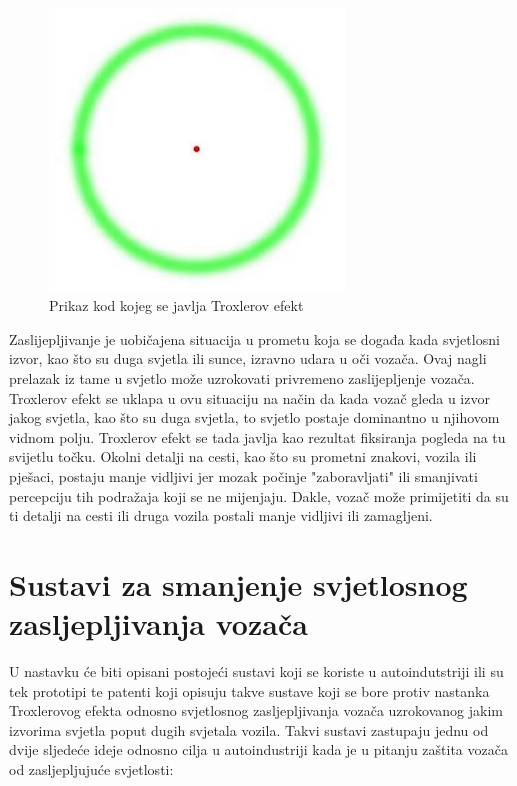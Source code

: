 \documentclass{foi}
\begin{document}
\begin{figure}[h!]
    \centering
    \includegraphics[width=0.7\textwidth]{slike/troxler_effect}
    \caption{Prikaz kod kojeg se javlja Troxlerov efekt \cite{Autoevolution2022}}
    \label{fig:troxlerov_efekt}
\end{figure}

\newpage

Zaslijepljivanje je uobičajena situacija u prometu koja se događa kada svjetlosni izvor, kao što su duga svjetla ili sunce, izravno udara u oči vozača. Ovaj nagli prelazak iz tame u svjetlo može uzrokovati privremeno zaslijepljenje vozača. Troxlerov efekt se uklapa u ovu situaciju na način da kada vozač gleda u izvor jakog svjetla, kao što su duga svjetla, to svjetlo postaje dominantno u njihovom vidnom polju. Troxlerov efekt se tada javlja kao rezultat fiksiranja pogleda na tu svijetlu točku. Okolni detalji na cesti, kao što su prometni znakovi, vozila ili pješaci, postaju manje vidljivi jer mozak počinje "zaboravljati" ili smanjivati percepciju tih podražaja koji se ne mijenjaju. Dakle, vozač može primijetiti da su ti detalji na cesti ili druga vozila postali manje vidljivi ili zamagljeni. \cite{Autoevolution2022}

\section{Sustavi za smanjenje svjetlosnog zasljepljivanja vozača}

U nastavku će biti opisani postojeći sustavi koji se koriste u autoindutstriji ili su tek prototipi te patenti koji opisuju takve sustave koji se bore protiv nastanka Troxlerovog efekta odnosno svjetlosnog zasljepljivanja vozača uzrokovanog jakim izvorima svjetla poput dugih svjetala vozila. Takvi sustavi zastupaju jednu od dvije sljedeće ideje odnosno cilja u autoindustriji kada je u pitanju zaštita vozača od zasljepljujuće svjetlosti:
\end{document}
